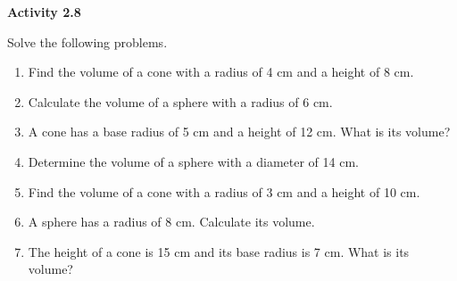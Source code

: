  \vspace{1ex}
\noindent\textbf{Activity 2.8}

\vspace{0.75ex}

Solve the following problems.
\begin{enumerate}[noitemsep, label = \color{blue}\arabic*. ]
    \item Find the volume of a cone with a radius of 4 cm and a height of 8 cm.
    \item Calculate the volume of a sphere with a radius of 6 cm.
    \item A cone has a base radius of 5 cm and a height of 12 cm. What is its volume?
    \item Determine the volume of a sphere with a diameter of 14 cm.
    \item Find the volume of a cone with a radius of 3 cm and a height of 10 cm.
    \item A sphere has a radius of 8 cm. Calculate its volume.
    \item The height of a cone is 15 cm and its base radius is 7 cm. What is its volume?
\end{enumerate}

